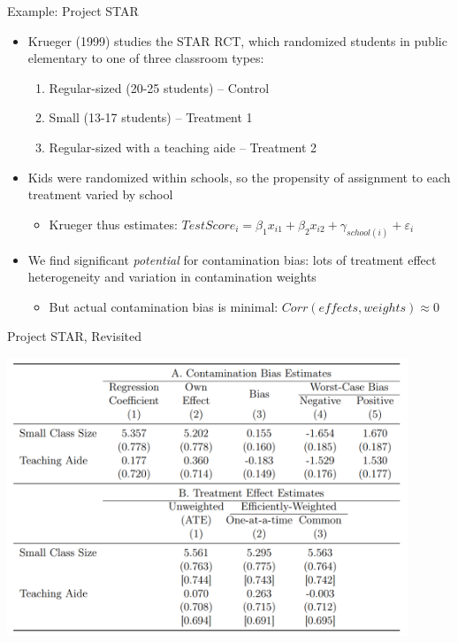 \documentclass[11pt,english]{beamer}
\begin{document}
\begin{frame}{Example: Project STAR}

\begin{itemize}
\item Krueger (1999) studies the STAR RCT, which randomized students in public elementary to one of three classroom types:\smallskip
\begin{enumerate}
\item Regular-sized (20-25 students) -- Control\smallskip
\item Small (13-17 students) -- Treatment 1\smallskip
\item Regular-sized with a teaching aide -- Treatment 2
\end{enumerate}\bigskip\pause{}

\item Kids were randomized within schools, so the propensity of assignment to each treatment varied by school\smallskip
\begin{itemize}
\item Krueger thus estimates: $TestScore_i= \beta_1 x_{i1} + \beta_2 x_{i2} +\gamma_{school(i)}+ \varepsilon_i$
\end{itemize}\bigskip\pause{}

\item We find significant \emph{potential} for contamination bias: lots of treatment effect heterogeneity and variation in contamination weights\smallskip
\begin{itemize}
\item But actual contamination bias is minimal: $Corr(effects,weights)\approx 0$
\end{itemize}
\end{itemize}

\end{frame}

\begin{frame}{Project STAR, Revisited}

\begin{center}
	\includegraphics[width=0.9\textwidth]{figures/STAR_CB.png}
\end{center}

\end{frame}
\end{document}
